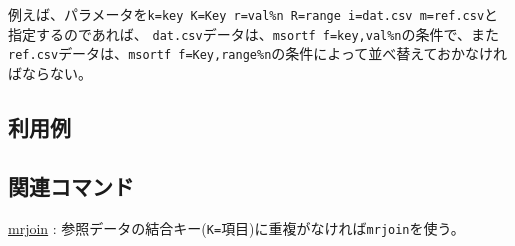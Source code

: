 
例えば、パラメータを\verb|k=key K=Key r=val%n R=range i=dat.csv m=ref.csv|と指定するのであれば、
\verb|dat.csv|データは、\verb|msortf f=key,val%n|の条件で、また
\verb|ref.csv|データは、\verb|msortf f=Key,range%n|の条件によって並べ替えておかなければならない。

\subsection*{利用例}

\subsection*{関連コマンド}
\hyperref[sect:mrjoin] {mrjoin} : 参照データの結合キー(\verb|K=|項目)に重複がなければ\verb|mrjoin|を使う。

%
